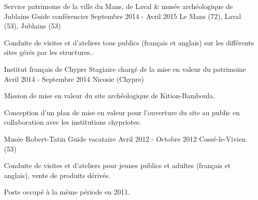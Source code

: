 \begin{cventries}
  \cventry
    {Service patrimoine de la ville du Mans, de Laval \& musée archéologique de Jublains} %
    {Guide conférencier} %
    {Septembre 2014 - Avril 2015} %
    {Le Mans (72), Laval (53), Jublains (53)} %
    {
      \begin{cvitems} %
        \item {Conduite de visites et d’ateliers tous publics (français et anglais) sur les différents sites gérés par les structures..}
      \end{cvitems}
    }

  \cventry
    {Institut français de Chypre} %
    {Stagiaire chargé de la mise en valeur du patrimoine} %
    {Avril 2014 - Septembre 2014} %
    {Nicosie (Chypre)} %
    {
      \begin{cvitems} %
        \item {Mission de mise en valeur du site archéologique de Kition-Bamboula.}
        \item {Conception d’un plan de mise en valeur pour l’ouverture du site au public en collaboration avec les institutions chypriotes.}
      \end{cvitems}
    }

  \cventry
    {Musée Robert-Tatin} %
    {Guide vacataire} %
    {Avril 2012 - Octobre 2012} %
    {Cossé-le-Vivien (53)} %
    {
      \begin{cvitems} %
        \item {Conduite de visites et d’ateliers pour jeunes publics et adultes (français et anglais), vente de produits dérivés.}
        \item {Poste occupé à la même période en 2011.}
      \end{cvitems}
    }

\end{cventries}
